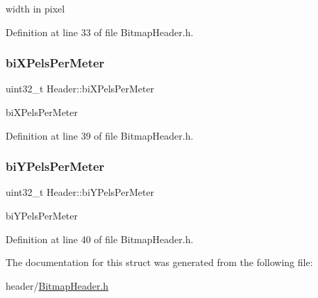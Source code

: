 width in pixel 

Definition at line 33 of file Bitmap\+Header.\+h.

\mbox{\label{structHeader_a63bb062f64b78846caf8399979a304ba}} 
\subsubsection{\texorpdfstring{biXPelsPerMeter}{biXPelsPerMeter}}
{\footnotesize\ttfamily uint32\+\_\+t Header\+::bi\+X\+Pels\+Per\+Meter}

bi\+X\+Pels\+Per\+Meter 

Definition at line 39 of file Bitmap\+Header.\+h.

\mbox{\label{structHeader_a2b3d87badc7563830106736beed76402}} 
\subsubsection{\texorpdfstring{biYPelsPerMeter}{biYPelsPerMeter}}
{\footnotesize\ttfamily uint32\+\_\+t Header\+::bi\+Y\+Pels\+Per\+Meter}

bi\+Y\+Pels\+Per\+Meter 

Definition at line 40 of file Bitmap\+Header.\+h.



The documentation for this struct was generated from the following file\+:\begin{DoxyCompactItemize}
\item 
header/\mbox{\hyperlink{BitmapHeader_8h}{Bitmap\+Header.\+h}}\end{DoxyCompactItemize}
